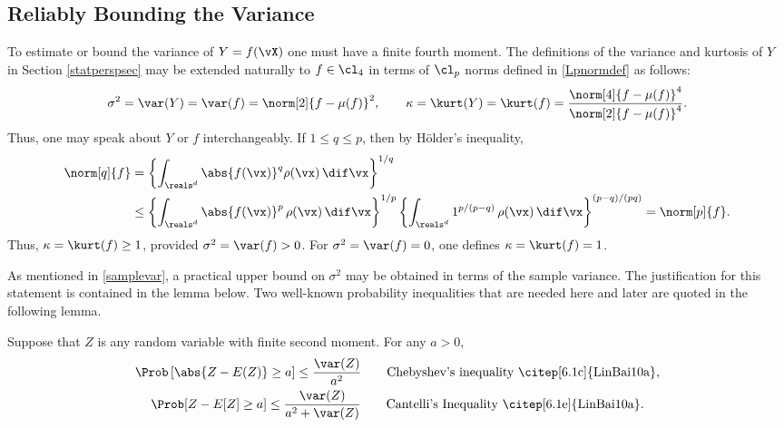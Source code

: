 \documentclass[graybox]{svmult}
\begin{document}
\subsection{Reliably Bounding the Variance} To estimate or bound the variance of $Y=f(\vX)$ one must have a finite fourth moment.  The definitions of the variance and kurtosis of $Y$ in Section \ref{statperspsec} may be extended naturally to $f \in \cl_4$ in terms of $\cl_p$ norms defined in \eqref{Lpnormdef} as follows:
\begin{equation*}
\sigma^2=\var(Y) = \var(f) = \norm[2]{f - \mu(f)}^2, \qquad \kappa=\kurt(Y) = \kurt(f) = \frac{\norm[4]{f - \mu(f)}^4}{\norm[2]{f - \mu(f)}^4}.
\end{equation*}
Thus, one may speak about $Y$ or $f$ interchangeably. If $1 \le q \le p$, then by H\"older's inequality,
\begin{align*}\label{LP}
\norm[q]{f} &=\left\{\int_{\reals^d} \abs{f(\vx)}^q \rho(\vx) \, \dif \vx\right\}^{1/q}\\
\nonumber & \le \left\{\int_{\reals^d} \abs{f(\vx)}^p \, \rho(\vx) \, \dif \vx \right\}^{1/p} \left\{\int_{\reals^d} 1^{p/(p-q)} \, \rho(\vx) \, \dif \vx\right\}^{(p-q)/(pq)} = \norm[p]{f}.
\end{align*}
Thus, $\kappa=\kurt(f) \ge 1$, provided $\sigma^2=\var(f)>0$.  For $\sigma^2=\var(f)=0$, one defines $\kappa=\kurt(f)=1$.

As mentioned in \eqref{samplevar}, a practical upper bound on $\sigma^2$ may be obtained in terms of the sample variance.  The justification for this statement is contained in the lemma below. Two well-known probability inequalities that are needed here and later are quoted in the following lemma.

\begin{lemma} \label{ChebCantlem}  Suppose that $Z$ is any random variable with finite second moment.  For any $a >0 $,
\begin{gather*}
\Prob\left[\abs{Z-E(Z)} \ge a \right] \le \frac{\var(Z)}{a^2} \qquad \text{Chebyshev's inequality \citep[6.1c]{LinBai10a}} , \\
\Prob[Z-E[Z] \geq a]\leq \frac{\var(Z)}{a^2+\var(Z)} \qquad
\text{Cantelli's Inequality \citep[6.1e]{LinBai10a}}.
\end{gather*}
\end{lemma}
\end{document}
